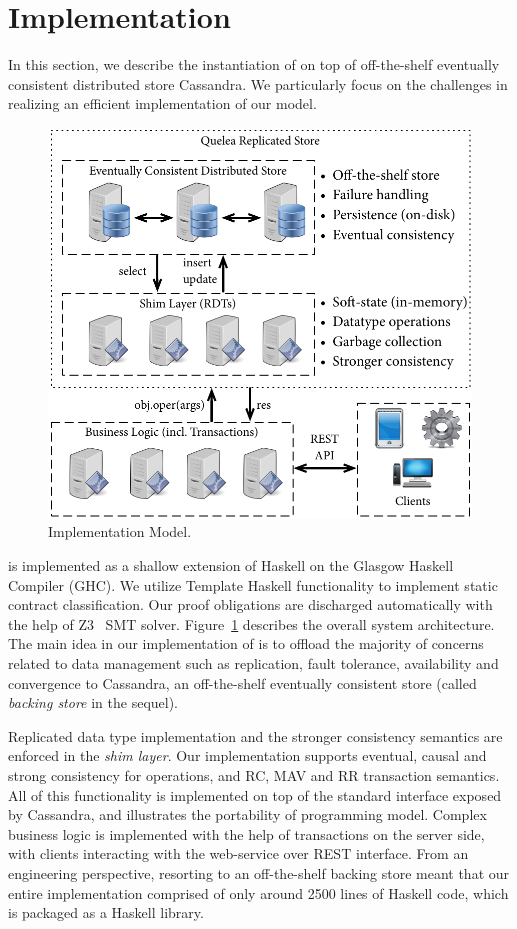 \section{Implementation}

In this section, we describe the instantiation of \name on top of off-the-shelf
eventually consistent distributed store Cassandra. We particularly focus on the
challenges in realizing an efficient implementation of our model.

\begin{figure}
\begin{center}
\includegraphics[width=0.9\columnwidth]{Figures/ImplModel}
\end{center}
\caption{Implementation Model.}
\label{fig:impl_mod}
\end{figure}

\name is implemented as a shallow extension of Haskell on the Glasgow Haskell
Compiler (GHC). We utilize Template Haskell functionality to implement static
contract classification. Our proof obligations are discharged automatically
with the help of Z3~\cite{} SMT solver. Figure~\ref{fig:impl_mod} describes the
overall system architecture. The main idea in our implementation of \name is to
offload the majority of concerns related to data management such as
replication, fault tolerance, availability and convergence to Cassandra, an
off-the-shelf eventually consistent store (called \emph{backing store} in the
sequel).

Replicated data type implementation and the stronger consistency semantics are
enforced in the \emph{shim layer}. Our implementation supports eventual, causal
and strong consistency for operations, and RC, MAV and RR transaction
semantics. All of this functionality is implemented on top of the standard
interface exposed by Cassandra, and illustrates the portability of \name
programming model. Complex business logic is implemented with the help of
transactions on the server side, with clients interacting with the web-service
over REST interface. From an engineering perspective, resorting to an
off-the-shelf backing store meant that our entire implementation comprised of
only around 2500 lines of Haskell code, which is packaged as a Haskell library.

